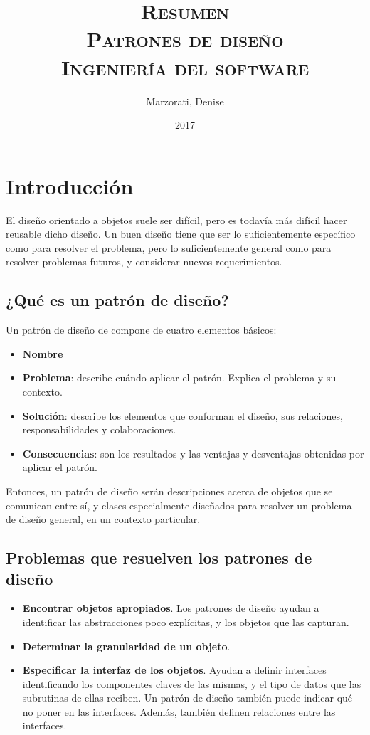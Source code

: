 \documentclass[a4paper, 10pt]{article}
\author{
    Marzorati, Denise \\
}
\date{
    2017
}
\title{
    \Huge \textsc{{\bfseries R}esumen} \\
    \Huge \textsc{Patrones de diseño} \\
    \large \textsc{Ingeniería del software} \\
}
\begin{document}
\maketitle

\section*{Introducción}
  El diseño orientado a objetos suele ser difícil, pero es todavía más difícil hacer reusable dicho
diseño. Un buen diseño tiene que ser lo suficientemente específico como para resolver el problema,
pero lo suficientemente general como para resolver problemas futuros, y considerar nuevos
requerimientos.

\subsection*{¿Qué es un patrón de diseño?}
  Un patrón de diseño de compone de cuatro elementos básicos:

  \begin{itemize}
    \item {\bfseries Nombre}
    \item {\bfseries Problema}: describe cuándo aplicar el patrón. Explica el problema y su
contexto.
    \item {\bfseries Solución}: describe los elementos que conforman el diseño, sus relaciones,
responsabilidades y colaboraciones.
    \item{\bfseries Consecuencias}: son los resultados y las ventajas y desventajas obtenidas por
aplicar el patrón.
  \end{itemize}

  Entonces, un patrón de diseño serán descripciones acerca de objetos que se comunican entre sí, y
clases especialmente diseñados para resolver un problema de diseño general, en un contexto
particular.

\subsection*{Problemas que resuelven los patrones de diseño}

  \begin{itemize}
    \item {\bfseries Encontrar objetos apropiados}. Los patrones de diseño ayudan a identificar las
abstracciones poco explícitas, y los objetos que las capturan.
    \item{\bfseries Determinar la granularidad de un objeto}.
    \item{\bfseries Especificar la interfaz de los objetos}. Ayudan a definir interfaces
identificando los componentes claves de las mismas, y el tipo de datos que las subrutinas de ellas
reciben. Un patrón de diseño también puede indicar qué no poner en las interfaces. Además, también
definen relaciones entre las interfaces.
  \end{itemize}
\end{document}
